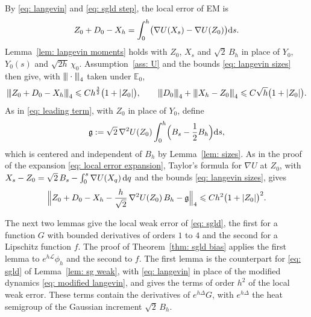 By \eqref{eq: langevin} and \eqref{eq: sgld step}, the local error of EM is
\begin{equation*}
    Z_0 + D_0 - X_h = \int_0^h \bigl( \nabla U(X_s) - \nabla U(Z_0) \bigr) \mathrm{d} s .
\end{equation*}
Lemma~\ref{lem: langevin moments} holds with $Z_0$, $X_s$ and $\sqrt2\, B_h$ in place of $Y_0$, $Y_0(s)$ and $\sqrt{2h}\, \chi_0$. Assumption~\ref{ass: U} and the bounds \eqref{eq: langevin sizes} then give, with ${\vert\kern-0.25ex\vert\kern-0.25ex\vert} \cdot {\vert\kern-0.25ex\vert\kern-0.25ex\vert}_4$ taken under $\mathbb E_0$,
\begin{equation}
    {\vert\kern-0.25ex\vert\kern-0.25ex\vert} Z_0 + D_0 - X_h {\vert\kern-0.25ex\vert\kern-0.25ex\vert}_4 \leqslant C h^{\frac32} \bigl( 1 + |Z_0| \bigr) , \qquad {\vert\kern-0.25ex\vert\kern-0.25ex\vert} D_0 {\vert\kern-0.25ex\vert\kern-0.25ex\vert}_4 + {\vert\kern-0.25ex\vert\kern-0.25ex\vert} X_h - Z_0 {\vert\kern-0.25ex\vert\kern-0.25ex\vert}_4 \leqslant C \sqrt h \bigl( 1 + |Z_0| \bigr) .
    \label{eq: sgld sizes}
\end{equation}
As in \eqref{eq: leading term}, with $Z_0$ in place of $Y_0$, define
\begin{equation}
    \mathfrak g := \sqrt2\, \nabla^2 U(Z_0) \int_0^h \Bigl( B_s - \frac12 B_h \Bigr) \mathrm{d} s ,
    \label{eq: em local error leading}
\end{equation}
which is centered and independent of $B_h$ by Lemma~\ref{lem: sizes}. As in the proof of the expansion \eqref{eq: local error expansion}, Taylor's formula for $\nabla U$ at $Z_0$, with $X_s - Z_0 = \sqrt2\, B_s - \int_0^s \nabla U(X_q)\, \mathrm{d} q$ and the bounds \eqref{eq: langevin sizes}, gives
\begin{equation}
    \Bigl\| Z_0 + D_0 - X_h - \frac{h}{\sqrt2}\, \nabla^2 U(Z_0)\, B_h - \mathfrak g \Bigr\|_4 \leqslant C h^2 \bigl( 1 + |Z_0| \bigr)^2 .
    \label{eq: em local error expansion}
\end{equation}

The next two lemmas give the local weak error of \eqref{eq: sgld}, the first for a function $G$ with bounded derivatives of orders $1$ to $4$ and the second for a Lipschitz function $f$. The proof of Theorem~\ref{thm: sgld bias} applies the first lemma to $e^{h\mathcal L} \phi_h$ and the second to $f$. The first lemma is the counterpart for \eqref{eq: sgld} of Lemma~\ref{lem: sg weak}, with \eqref{eq: langevin} in place of the modified dynamics \eqref{eq: modified langevin}, and gives the terms of order $h^2$ of the local weak error. These terms contain the derivatives of $e^{h\Delta} G$, with $e^{h\Delta}$ the heat semigroup of the Gaussian increment $\sqrt2\, B_h$.

